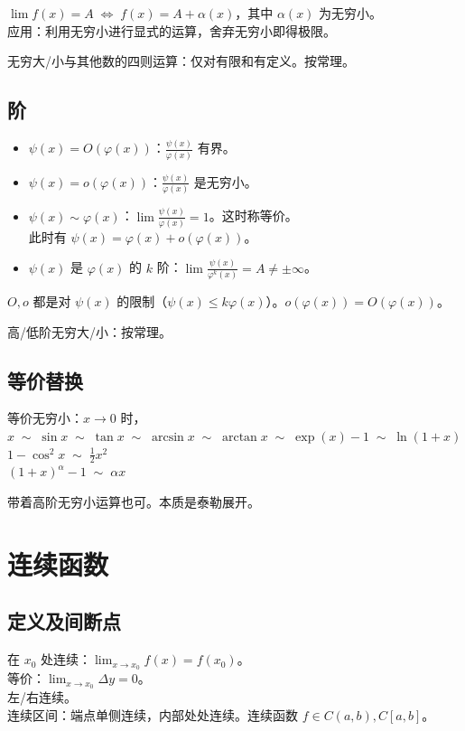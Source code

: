 \documentclass[12pt, a4paper, UTF8, openany]{ctexbook}
\begin{document}
        $\lim f(x) = A \; \iff \; f(x) = A + \alpha(x)$，其中 $\alpha(x)$ 为无穷小。\\
        {\heiti 应用}：利用无穷小进行显式的运算，舍弃无穷小即得极限。

        无穷大/小与其他数的四则运算：仅对有限和有定义。按常理。

        \subsection{阶}
        \begin{itemize}
            \item $\psi(x) = O(\varphi(x))$：$\frac{\psi(x)}{\varphi(x)}$ 有界。
            \item $\psi(x) = o(\varphi(x))$：$\frac{\psi(x)}{\varphi(x)}$ 是无穷小。
            \item $\psi(x) \sim \varphi(x)$：$\lim \frac{\psi(x)}{\varphi(x)} = 1$。这时称等价。\\
                此时有 $\psi(x) = \varphi(x) + o(\varphi(x))$。
            \item $\psi(x)$ 是 $\varphi(x)$ 的 $k$ 阶：$\lim \frac{\psi(x)}{\varphi^k(x)} = A \neq \pm \infty$。
        \end{itemize}
        $O, o$ 都是对 $\psi(x)$ 的限制（$\psi(x) \leqslant k\varphi(x)$）。$o(\varphi(x)) = O(\varphi(x))$。

        高/低阶无穷大/小：按常理。

        \subsection{等价替换}
        等价无穷小：$x \to 0$ 时，\\
        $x \; \sim \; \sin x \; \sim \; \tan x \; \sim \; 
            \arcsin x \; \sim \; \arctan x \; \sim \; \exp(x) - 1 \; \sim \; \ln(1 + x)$ \\
        $1 - \cos^2 x \; \sim \; \frac{1}{2}x^2$ \\
        $(1 + x)^\alpha - 1 \; \sim \; \alpha x$

        带着高阶无穷小运算也可。本质是泰勒展开。

    \section{连续函数}
        \subsection{定义及间断点}
        在 $x_0$ 处连续：$\lim_{x \to x_0} f(x) = f(x_0)$。\\
        等价：$\lim_{x \to x_0} \Delta y = 0$。\\
        左/右连续。\\
        连续区间：端点单侧连续，内部处处连续。连续函数 $f \in C(a, b), C[a, b]$。
\end{document}
